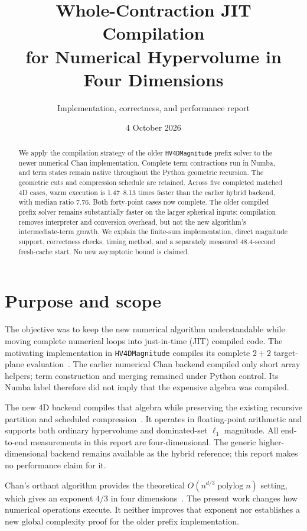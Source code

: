 \documentclass[12pt,a4paper]{article}
\title{Whole-Contraction JIT Compilation\\for Numerical Hypervolume in Four Dimensions}
\author{Implementation, correctness, and performance report}
\date{4 October 2026}
\begin{document}
\maketitle
\begin{abstract}
We apply the compilation strategy of the older \texttt{HV4DMagnitude} prefix
solver to the newer numerical Chan implementation. Complete term contractions
run in Numba, and term states remain native throughout the Python geometric
recursion. The geometric cuts and compression schedule are retained.
Across five completed matched 4D cases, warm execution is 1.47--8.13 times
faster than the earlier hybrid backend, with median ratio 7.76. Both forty-point
cases now complete. The older compiled prefix solver remains substantially
faster on the larger spherical inputs: compilation removes interpreter and
conversion overhead, but not the new algorithm's intermediate-term growth.
We explain the finite-sum implementation, direct magnitude support, correctness
checks, timing method, and a separately measured 48.4-second fresh-cache start.
No new asymptotic bound is claimed.
\end{abstract}

\section{Purpose and scope}
The objective was to keep the new numerical algorithm understandable while
moving complete numerical loops into just-in-time (JIT) compiled code.
The motivating implementation in \texttt{HV4DMagnitude} compiles its complete
$2+2$ target-plane evaluation~\cite{old}. The earlier numerical Chan backend
compiled only short array helpers; term construction and merging remained
under Python control. Its Numba label therefore did not imply that the
expensive algebra was compiled.

The new 4D backend compiles that algebra while preserving the existing
recursive partition and scheduled compression~\cite{release}. It operates
in floating-point arithmetic and supports both ordinary hypervolume and
dominated-set $\ell_1$ magnitude. All end-to-end measurements in this report
are four-dimensional. The generic higher-dimensional backend remains available
as the hybrid reference; this report makes no performance claim for it.

Chan's orthant algorithm provides the theoretical
$O(n^{d/3}\operatorname{polylog}n)$ setting, which gives an exponent $4/3$
in four dimensions~\cite{chan}. The present work changes how numerical
operations execute. It neither improves that exponent nor establishes a new
global complexity proof for the older prefix implementation.
\end{document}
